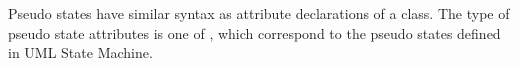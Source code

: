 \begin{comment}
\item \ttt{initial\_state}: A state is defined as an initial state, which has an incoming transition outgoing from a pseudo initial state within the same region or composite state. 

\item \ttt{effName}: For initial state, this is the transition effect associated with the initial transition.

\item \ttt{concurrent state}: The representation of a concurrent state. 
The latter is composed of a set of regions.
Each region contains a set of vertices, which for each is either a state or a pseudo state.

\end{itemize}
\end{comment}



Pseudo states have similar syntax as attribute declarations of a class.
The type of pseudo state attributes is one of , which correspond to the pseudo states defined in UML State Machine. 


\begin{minipage}{\columnwidth}
	
\end{minipage}



